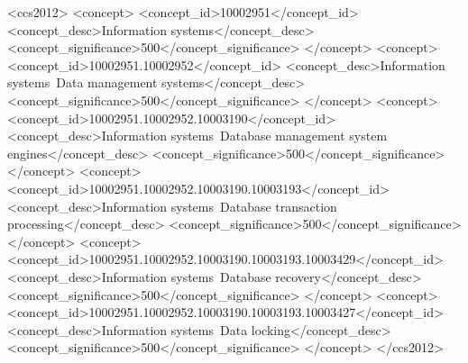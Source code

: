 \begin{CCSXML}
<ccs2012>
   <concept>
       <concept_id>10002951</concept_id>
       <concept_desc>Information systems</concept_desc>
       <concept_significance>500</concept_significance>
       </concept>
   <concept>
       <concept_id>10002951.10002952</concept_id>
       <concept_desc>Information systems~Data management systems</concept_desc>
       <concept_significance>500</concept_significance>
       </concept>
   <concept>
       <concept_id>10002951.10002952.10003190</concept_id>
       <concept_desc>Information systems~Database management system engines</concept_desc>
       <concept_significance>500</concept_significance>
       </concept>
   <concept>
       <concept_id>10002951.10002952.10003190.10003193</concept_id>
       <concept_desc>Information systems~Database transaction processing</concept_desc>
       <concept_significance>500</concept_significance>
       </concept>
   <concept>
       <concept_id>10002951.10002952.10003190.10003193.10003429</concept_id>
       <concept_desc>Information systems~Database recovery</concept_desc>
       <concept_significance>500</concept_significance>
       </concept>
   <concept>
       <concept_id>10002951.10002952.10003190.10003193.10003427</concept_id>
       <concept_desc>Information systems~Data locking</concept_desc>
       <concept_significance>500</concept_significance>
       </concept>
 </ccs2012>
\end{CCSXML}


\newtheorem{thm}{Theorem}[]
\newtheorem*{thmun}{Theorem}
\newtheorem{cor}[thm]{Corollary}
\newtheorem{lem}[thm]{Lemma}
\theoremstyle{definition}
\newtheorem{defn}[thm]{Definition}
\newtheorem{ex}[thm]{Example}
\theoremstyle{plain}


